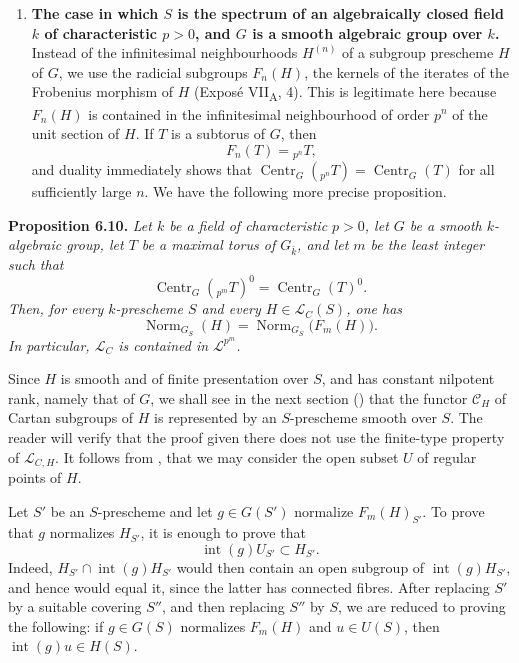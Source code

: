 \begin{enumerate}
\item \textbf{The case in which \(S\) is the spectrum of an algebraically
closed field \(k\) of characteristic \(p>0\), and \(G\) is a smooth
algebraic group over \(k\).}
Instead of the infinitesimal neighbourhoods \(H^{(n)}\) of a subgroup
prescheme \(H\) of \(G\), we use the radicial subgroups \(F_n(H)\), the
kernels of the iterates of the Frobenius morphism of \(H\)
(Exposé VII\textsubscript{A}, 4). This is legitimate here because \(F_n(H)\)
is contained in the infinitesimal neighbourhood of order \(p^n\) of the
unit section of \(H\). If \(T\) is a subtorus of \(G\), then
\[
F_n(T)={}_{p^n}T,
\]
and duality immediately shows that
\(\operatorname{Centr}_G({}_{p^n}T)=\operatorname{Centr}_G(T)\) for all
sufficiently large \(n\). We have the following more precise proposition.
\end{enumerate}

\textbf{Proposition 6.10.} \emph{Let \(k\) be a field of characteristic
\(p>0\), let \(G\) be a smooth \(k\)-algebraic group, let \(T\) be a maximal
torus of \(G_{\bar k}\), and let \(m\) be the least integer such that
\[
\operatorname{Centr}_G({}_{p^m}T)^0
 =\operatorname{Centr}_G(T)^0.
\]
Then, for every \(k\)-prescheme \(S\) and every
\(H\in\mathcal L_C(S)\), one has
\[
\operatorname{Norm}_{G_S}(H)
 =\operatorname{Norm}_{G_S}\bigl(F_m(H)\bigr).
\]
In particular, \(\mathcal L_C\) is contained in \(\mathcal L^{p^m}\).}

Since \(H\) is smooth and of finite presentation over \(S\), and has constant
nilpotent rank, namely that of \(G\), we shall see in the next section ()
that the functor \(\mathcal C_H\) of Cartan subgroups of \(H\) is represented
by an \(S\)-prescheme smooth over \(S\). The reader will verify that the proof
given there does not use the finite-type property of \(\mathcal L_{C,H}\).
It follows from , that we may consider the open subset \(U\)
of regular points of \(H\).

Let \(S'\) be an \(S\)-prescheme and let \(g\in G(S')\) normalize
\(F_m(H)_{S'}\). To prove that \(g\) normalizes \(H_{S'}\), it is enough to
prove that
\[
\operatorname{int}(g)U_{S'}\subset H_{S'}.
\]
Indeed, \(H_{S'}\cap\operatorname{int}(g)H_{S'}\) would then contain an open
subgroup of \(\operatorname{int}(g)H_{S'}\), and hence would equal it, since
the latter has connected fibres. After replacing \(S'\) by a suitable
covering \(S''\), and then replacing \(S''\) by \(S\), we are reduced to
proving the following: if \(g\in G(S)\) normalizes \(F_m(H)\) and
\(u\in U(S)\), then \(\operatorname{int}(g)u\in H(S)\).

